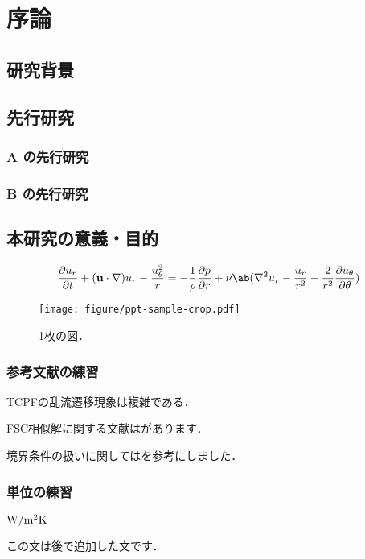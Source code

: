 
\chapter{序論}
\label{ch:introduction}


\section{研究背景}
\label{sec:background}


\section{先行研究}
\label{sec:previous}

\subsection{A の先行研究}
\label{ssec:previous_A}

\subsection{B の先行研究}
\label{ssec:previous_B}


\section{本研究の意義・目的}
\label{sec:objective}

\begin{equation}
    \pdv{u_r}{t} + (\mathbf{u}\cdot\nabla)u_r - \frac{u_\theta^2}{r} = 
    -\frac{1}{\rho}\pdv{p}{r} + \nu\ab(\nabla^2 u_r - \frac{u_r}{r^2} - \frac{2}{r^2}\pdv{u_\theta}{\theta})
    \label{eq:NSr2}
\end{equation}

\begin{figure}[tp]
    \centering
    \texttt{[image: figure/ppt-sample-crop.pdf]}
    \caption{1枚の図．}
    \label{fig:one_figure}
\end{figure}

\subsection{参考文献の練習}
\label{ssec:bibtex}

\citet{Matsukawa:PoF2022}

TCPFの乱流遷移現象は複雑である\citep{Matsukawa:PoF2022}．

FSC相似解に関する文献は\citet{Liu:2021}があります．

境界条件の扱いに関しては\citet{Guastoni:2021}を参考にしました．

\subsection{単位の練習}
\label{ssec:unit}

$\si[per-mode=symbol]{\watt\per{\square\meter\kelvin}}$

この文は後で追加した文です．